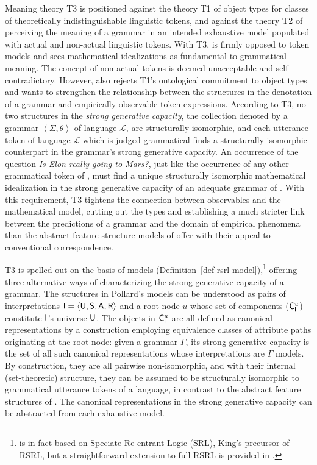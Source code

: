 \documentclass[output=paper
 	        ,biblatex
                ,babelshorthands
                ,newtxmath
                ,draftmode
                ,colorlinks, citecolor=brown
]{langscibook}
\begin{document}
{Meaning theory T3 is positioned against the theory T1 of object types
for classes of theoretically indistinguishable linguistic tokens, and
against the theory T2 of perceiving the meaning of a grammar in an
intended exhaustive model populated with actual and non-actual
linguistic tokens.  With T3, \cite{Pollard99a} is firmly opposed to
token models and sees mathematical idealizations as fundamental to
grammatical meaning.  The concept of non-actual tokens is deemed
unacceptable and self-contradictory. However, \cite{Pollard99a} also
rejects T1's ontological commitment to object types and wants to
strengthen the relationship between the structures in the denotation
of a grammar and empirically observable token expressions.  According
to T3, no two structures in the \emph{strong generative capacity}, the
collection denoted by a grammar $\left< \Sigma, \theta\right>$ of
language $\mathcal{L}$, are
structurally isomorphic, and each utterance token of language
$\mathcal{L}$ which is judged grammatical finds a structurally
isomorphic counterpart in the grammar's strong generative capacity.
An occurrence of the question \emph{Is Elon really going to Mars?}, just
like the occurrence of any other grammatical token of , must
find a unique structurally isomorphic mathematical idealization in the
strong generative capacity of an
adequate grammar of . With this requirement, T3 tightens the
connection between observables and the mathematical model, cutting out
the types and establishing a much stricter link between the
predictions of a grammar and the domain of empirical phenomena than
the abstract feature structure models of \cite{PollardSag1994} offer
with their appeal to conventional correspondence.

T3 is spelled out on the basis of models
(Definition~\ref{def-rsrl-model}),\footnote{\cite{Pollard99a} is in
  fact based on Speciate Re-entrant Logic (SRL), King's precursor of
  RSRL, but a straightforward extension to full RSRL is provided in
  \cite{Richter2004a-u}.} offering three alternative ways of
characterizing the strong generative capacity of a grammar. The
structures in Pollard's models can be understood as pairs of
interpretations $\mathsf{I}=\langle\mathsf{U},\mathsf{S},\mathsf{A},\mathsf{R}\rangle$ and a root node $u$ whose set
of components ($\mathsf{C}_{\mathsf{I}}^u$) constitute $\mathsf{I}$'s universe
$\mathsf{U}$. The objects in $\mathsf{C}_{\mathsf{I}}^u$ are all defined as
canonical representations by a construction employing equivalence
classes of attribute paths originating at the root node: given a
grammar $\Gamma$, its strong generative capacity is the set of all
such canonical representations whose interpretations are $\Gamma$
models. By construction, they are all pairwise non-isomorphic, and
with their internal (set-theoretic) structure, they can be assumed to
be structurally isomorphic to grammatical utterance tokens of a
language, in contrast to the abstract feature structures of
\cite{PollardSag1994}. The canonical representations in the strong
generative capacity can be abstracted from each exhaustive model.



}
\end{document}
